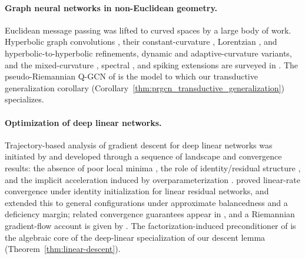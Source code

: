 \documentclass[letterpaper]{article}
\begin{document}
\paragraph{Graph neural networks in non-Euclidean geometry.}
Euclidean message passing \cite{kipf2016semi, hamilton2017inductive,
velivckovic2017graph, xu2018powerful} was lifted to curved spaces by a
large body of work. Hyperbolic graph convolutions
\cite{yang2022hyperbolic}, their constant-curvature
\cite{bachmann2020constant}, Lorentzian \cite{zhang2021lorentzian}, and
hyperbolic-to-hyperbolic \cite{dai2021hyperbolic} refinements, dynamic
\cite{sun2021hyperbolic} and adaptive-curvature \cite{fu2021ace}
variants, and the mixed-curvature \cite{sun2022self, wang2021mixed,
cho2023curve}, spectral \cite{grover2025spectro}, and spiking
\cite{sun2024spiking} extensions are surveyed in
\cite{yang2022hyperbolic}. The pseudo-Riemannian Q-GCN of
\cite{xiong2022pseudo} is the model to which our transductive
generalization corollary
(Corollary~\ref{thm:prgcn_transductive_generalization}) specializes.

\paragraph{Optimization of deep linear networks.}
Trajectory-based analysis of gradient descent for deep linear networks was
initiated by \cite{saxe2013exact} and developed through a sequence of
landscape and convergence results: the absence of poor local minima
\cite{lu2017depth, lu2017depth, laurent2018deep}, the role of
identity/residual structure \cite{hardt2016identity}, and the implicit
acceleration induced by overparameterization
\cite{arora2018convergence}. \cite{bartlett2017spectrally} proved
linear-rate convergence under identity initialization for linear residual
networks, and \cite{arora2018convergence} extended this to general
configurations under approximate balancedness and a deficiency margin;
related convergence guarantees appear in
\cite{shamir2019exponential, du2019width, du2019gradient,
allen2019convergence, zou2020global, ji2018gradient, nouiehed2022learning},
and a Riemannian gradient-flow account is given by \cite{bah2022learning}.
The factorization-induced preconditioner of
\cite{arora2018convergence, arora2018convergence} is the algebraic core
of the deep-linear specialization of our descent lemma
(Theorem~\ref{thm:linear-descent}).
\end{document}
